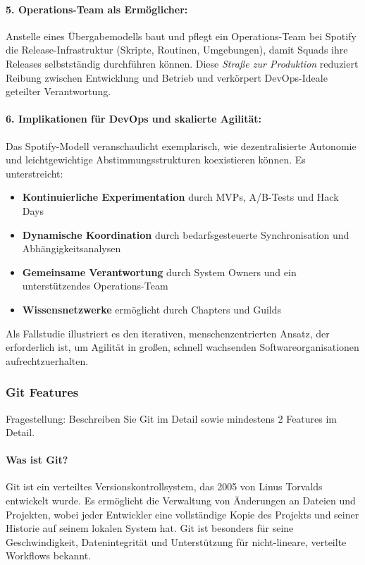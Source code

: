 \paragraph{5. Operations-Team als Ermöglicher:} Anstelle eines Übergabemodells baut und pflegt ein Operations-Team bei Spotify die Release-Infrastruktur (Skripte, Routinen, Umgebungen), damit Squads ihre Releases selbstständig durchführen können. 
Diese \textit{Straße zur Produktion} reduziert Reibung zwischen Entwicklung und Betrieb und verkörpert DevOps-Ideale geteilter Verantwortung.
\paragraph{6. Implikationen für DevOps und skalierte Agilität:} Das Spotify-Modell veranschaulicht exemplarisch, wie dezentralisierte Autonomie und leichtgewichtige Abstimmungsstrukturen koexistieren können. Es unterstreicht:
\begin{itemize}
    \item \textbf{Kontinuierliche Experimentation} durch MVPs, A/B-Tests und Hack Days
    \item \textbf{Dynamische Koordination} durch bedarfsgesteuerte Synchronisation und Abhängigkeitsanalysen
    \item \textbf{Gemeinsame Verantwortung} durch System Owners und ein unterstützendes Operations-Team
    \item \textbf{Wissensnetzwerke} ermöglicht durch Chapters und Guilds
\end{itemize}
Als Fallstudie illustriert es den iterativen, menschenzentrierten Ansatz, der erforderlich ist, um Agilität in großen, schnell wachsenden Softwareorganisationen aufrechtzuerhalten.

\subsubsection{Git Features}

Fragestellung: Beschreiben Sie Git im Detail sowie mindestens 2 Features im Detail.

\paragraph{Was ist Git?}
Git ist ein verteiltes Versionskontrollsystem, das 2005 von Linus Torvalds entwickelt wurde.
Es ermöglicht die Verwaltung von Änderungen an Dateien und Projekten,
wobei jeder Entwickler eine vollständige Kopie des Projekts und seiner Historie auf seinem lokalen System hat.
Git ist besonders für seine Geschwindigkeit, Datenintegrität und Unterstützung für nicht-lineare, verteilte 
Workflows bekannt. \cite{github-git}

